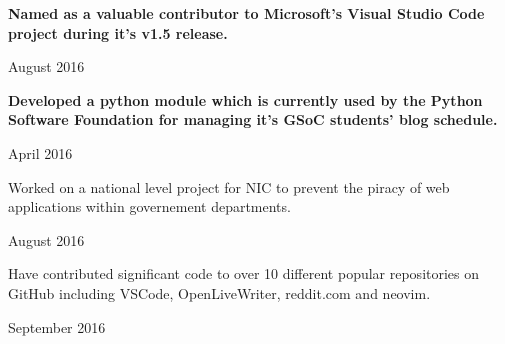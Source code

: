 
\begin{cvachievements}

\cvachievement%
  {%
    \begin{cvachievementitems}
      \item{\textbf{Named as a valuable contributor to Microsoft's Visual Studio
            Code project during it's v1.5 release.}} %
    \end{cvachievementitems}
  }
  {August 2016} %

\cvachievement%
  {%
    \begin{cvachievementitems}
      \item{\textbf{Developed a python module which is currently used by the
            Python Software Foundation for managing it's GSoC students' blog
            schedule.}} %
    \end{cvachievementitems}
  }
  {April 2016} %

\cvachievement%
  {%
    \begin{cvachievementitems}
      \item{Worked on a national level project for NIC to prevent the piracy of
            web applications within governement departments.} %
    \end{cvachievementitems}
  }
  {August 2016} %

\cvachievement%
  {%
    \begin{cvachievementitems}
      \item{Have contributed significant code to over 10 different popular
            repositories on GitHub including VSCode, OpenLiveWriter, reddit.com
            and neovim.} %
    \end{cvachievementitems}
  }
  {September 2016} %

\end{cvachievements}
